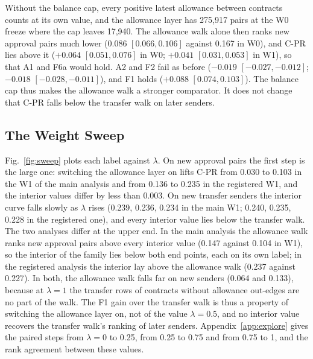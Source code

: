 \documentclass{ieeeaccess}
\newcommand{\cpr}{\mbox{C-PR}}
\begin{document}
Without the balance cap, every positive latest allowance between contracts counts at its own value, and the allowance layer has 275,917 pairs at the W0 freeze where the cap leaves 17,940. The allowance walk alone then ranks new approval pairs much lower (0.086 $[0.066,0.106]$ against 0.167 in W0), and \cpr{} lies above it ($+0.064$ $[0.051,0.076]$ in W0; $+0.041$ $[0.031,0.053]$ in W1), so that A1 and F6a would hold. A2 and F2 fail as before ($-0.019$ $[-0.027,-0.012]$; $-0.018$ $[-0.028,-0.011]$), and F1 holds ($+0.088$ $[0.074,0.103]$). The balance cap thus makes the allowance walk a stronger comparator. It does not change that \cpr{} falls below the transfer walk on later senders.



\subsection{The Weight Sweep}
\label{sec:sweep}
Fig.~\ref{fig:sweep} plots each label against $\lambda$. On new approval pairs the first step is the large one: switching the allowance layer on lifts \cpr{} from 0.030 to 0.103 in the W1 of the main analysis and from 0.136 to 0.235 in the registered W1, and the interior values differ by less than 0.003. On new transfer senders the interior curve falls slowly as $\lambda$ rises (0.239, 0.236, 0.234 in the main W1; 0.240, 0.235, 0.228 in the registered one), and every interior value lies below the transfer walk. The two analyses differ at the upper end. In the main analysis the allowance walk ranks new approval pairs above every interior value (0.147 against 0.104 in W1), so the interior of the family lies below both end points, each on its own label; in the registered analysis the interior lay above the allowance walk (0.237 against 0.227). In both, the allowance walk falls far on new senders (0.064 and 0.133), because at $\lambda=1$ the transfer rows of contracts without allowance out-edges are no part of the walk. The F1 gain over the transfer walk is thus a property of switching the allowance layer on, not of the value $\lambda=0.5$, and no interior value recovers the transfer walk's ranking of later senders. Appendix~\ref{app:explore} gives the paired steps from $\lambda=0$ to 0.25, from 0.25 to 0.75 and from 0.75 to 1, and the rank agreement between these values.
\end{document}
